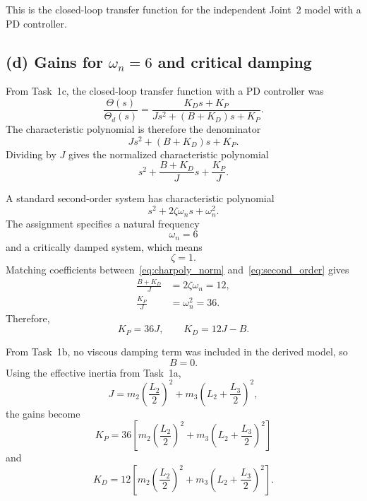 \documentclass{article}
\begin{document}
This is the closed-loop transfer function for the independent Joint~2 model with a PD controller.
\subsection*{(d) Gains for $\omega_n = 6$ and critical damping}

From Task~1c, the closed-loop transfer function with a PD controller was
\begin{equation}
    \frac{\Theta(s)}{\Theta_d(s)}
    =
    \frac{K_Ds+K_P}
    {Js^2+(B+K_D)s+K_P}.
\end{equation}
The characteristic polynomial is therefore the denominator
\begin{equation}
    Js^2+(B+K_D)s+K_P.
\end{equation}
Dividing by $J$ gives the normalized characteristic polynomial
\begin{equation}
    s^2 + \frac{B+K_D}{J}s + \frac{K_P}{J}.
    \label{eq:charpoly_norm}
\end{equation}

A standard second-order system has characteristic polynomial
\begin{equation}
    s^2 + 2\zeta\omega_n s + \omega_n^2.
    \label{eq:second_order}
\end{equation}
The assignment specifies a natural frequency
\[
    \omega_n = 6
\]
and a critically damped system, which means
\[
    \zeta = 1.
\]
Matching coefficients between~\eqref{eq:charpoly_norm} and~\eqref{eq:second_order} gives
\begin{align}
    \frac{B+K_D}{J} &= 2\zeta\omega_n = 12, \\
    \frac{K_P}{J} &= \omega_n^2 = 36.
\end{align}
Therefore,
\begin{equation}
    K_P = 36J,
    \qquad
    K_D = 12J - B.
    \label{eq:kp_kd_general}
\end{equation}

From Task~1b, no viscous damping term was included in the derived model, so
\[
    B = 0.
\]
Using the effective inertia from Task~1a,
\begin{equation}
    J
    =
    m_2\left(\frac{L_2}{2}\right)^2
    +
    m_3\left(L_2+\frac{L_3}{2}\right)^2,
\end{equation}
the gains become
\begin{equation}
    \boxed{
    K_P
    =
    36
    \left[
    m_2\left(\frac{L_2}{2}\right)^2
    +
    m_3\left(L_2+\frac{L_3}{2}\right)^2
    \right]
    }
\end{equation}
and
\begin{equation}
    \boxed{
    K_D
    =
    12
    \left[
    m_2\left(\frac{L_2}{2}\right)^2
    +
    m_3\left(L_2+\frac{L_3}{2}\right)^2
    \right]
    }.
\end{equation}
\end{document}
